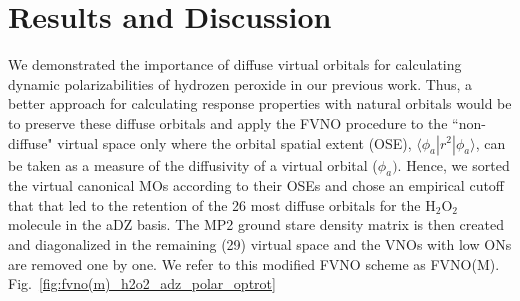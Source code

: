 \section{Results and Discussion}
We demonstrated the importance of diffuse virtual orbitals for calculating  
dynamic polarizabilities of hydrozen peroxide in our previous work.
Thus, a better approach for calculating response properties with natural
orbitals would be to preserve these diffuse orbitals and apply the FVNO procedure 
to the ``non-diffuse" virtual space only where the orbital spatial extent (OSE), 
$\langle\phi_a| r^2 | \phi_a\rangle$, can be taken as a measure of the diffusivity 
of a virtual orbital ($\phi_a)$. Hence, we sorted the virtual canonical MOs 
according to their OSEs and chose an empirical cutoff that that led to the 
retention of the 26 most diffuse orbitals for the H$_2$O$_2$ molecule in the
aDZ basis. The MP2 ground stare density matrix is then created and diagonalized in the 
remaining (29) virtual space and the VNOs with low ONs are removed one by one. We refer 
to this modified FVNO scheme as FVNO(M). Fig.~\ref{fig:fvno(m)_h2o2_adz_polar_optrot} %
